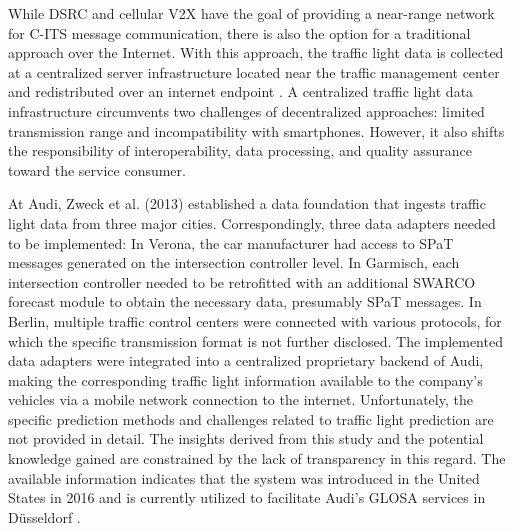 While DSRC and cellular V2X have the goal of providing a near-range network for C-ITS message communication, there is also the option for a traditional approach over the Internet. With this approach, the traffic light data is collected at a centralized server infrastructure located near the traffic management center and redistributed over an internet endpoint \cite{zweck_traffic_2013, protschky_extensive_2014, protschky_adaptive_2014}. A centralized traffic light data infrastructure circumvents two challenges of decentralized approaches: limited transmission range and incompatibility with smartphones. However, it also shifts the responsibility of interoperability, data processing, and quality assurance toward the service consumer.

At Audi, Zweck et al. (2013) \cite{zweck_traffic_2013} established a data foundation that ingests traffic light data from three major cities. Correspondingly, three data adapters needed to be implemented: In Verona, the car manufacturer had access to SPaT messages generated on the intersection controller level. In Garmisch, each intersection controller needed to be retrofitted with an additional SWARCO forecast module to obtain the necessary data, presumably SPaT messages. In Berlin, multiple traffic control centers were connected with various protocols, for which the specific transmission format is not further disclosed. The implemented data adapters were integrated into a centralized proprietary backend of Audi, making the corresponding traffic light information available to the company's vehicles via a mobile network connection to the internet. Unfortunately, the specific prediction methods and challenges related to traffic light prediction are not provided in detail. The insights derived from this study and the potential knowledge gained are constrained by the lack of transparency in this regard. The available information indicates that the system was introduced in the United States in 2016 and is currently utilized to facilitate Audi's GLOSA services in Düsseldorf \cite{neuner_leitfaden_2020}.

